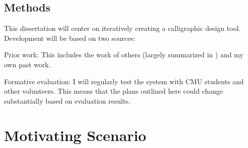 \documentclass[12pt]{article}
\newenvironment{packed_enum}{
\begin{enumerate}
  \setlength{\itemsep}{1pt}
  \setlength{\parskip}{0pt}
  \setlength{\parsep}{0pt}
}{\end{enumerate}}
\begin{document}
\subsection{Methods}

This dissertation will center on iteratively creating a calligraphic
design tool. Development will be based on two sources:

\begin{packed_enum}
\item Prior work: This includes the work of others (largely summarized
  in \cite{johnson-sketch-review}) and my own past work.
\item Formative evaluation: I will regularly test the system with CMU
  students and other volunteers. This means that the plans outlined
  here could change substantially based on evaluation results.
\end{packed_enum}

\section{Motivating Scenario}

\end{document}
